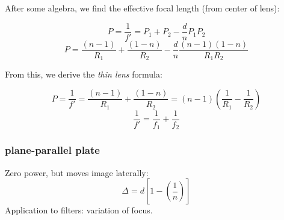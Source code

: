 \documentclass[12pt]{article}
\begin{document}
After some algebra, we find the effective focal length (from center of
lens):

    $$ P=\frac{1}{f'}=P_{1}+P_{2}-\frac{d}{n}P_{1}P_{2}   $$
    $$ P=\frac{(n-1)}{R_{1}}+\frac{(1-n)}{R_{2}}-\frac{d}{n}
         \frac{(n-1)(1-n)}{R_{1}R_{2}}  $$

From this, we derive the \emph{thin lens} formula:

    $$ P=\frac{1}{f'} = \frac{(n-1)}{R_{1}}+\frac{(1-n)}{R_{2}}
         = (n-1)\left( \frac{1}{R_1} - \frac{1}{R_2}\right)  $$
    $$ \frac{1}{f'} = \frac{1}{f_{1}} + \frac{1}{f_{2}}   $$

\subsubsection*{plane-parallel plate}
Zero power, but moves image laterally:
$$\Delta = d\left[1-\left(\frac{1}{n}\right)\right]$$
Application to filters: variation of focus.
\end{document}
